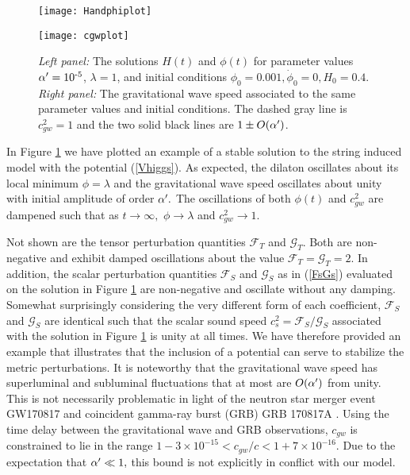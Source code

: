 \documentclass[amsmath,amssymb,11pt]{article}
\begin{document}
\begin{figure}[t]
    \centering
    \begin{minipage}{0.5\textwidth}
        \centering
        \texttt{[image: Handphiplot]} %
    \end{minipage}\hfill
    \begin{minipage}{0.5\textwidth}
        \centering
        \texttt{[image: cgwplot]} %
    \end{minipage}
    \caption{\textit{Left panel:} The solutions $H(t)$ and $\phi(t)$ for parameter values $\alpha'=10^{\text{-}5}$, $\lambda=1$, and initial conditions $\phi_0=0.001,\dot{\phi}_0=0,H_0=0.4.$ \textit{Right panel:} The gravitational wave speed associated to the same parameter values and initial conditions. The dashed gray line is $c_{gw}^2=1$ and the two solid black lines are $1\pm O(\alpha')$. }\label{fig:plots}
\end{figure}

In Figure \ref{fig:plots} we have plotted an example of a stable solution to the string induced model with the potential (\ref{Vhiggs}). As expected, the dilaton oscillates about its local minimum $\phi=\lambda$ and the gravitational wave speed oscillates about unity with initial amplitude of order $\alpha'.$ The oscillations of both $\phi(t)$ and $c_{gw}^2$ are dampened such that as $t\rightarrow\infty,$ $\phi\rightarrow\lambda$ and $c_{gw}^2\rightarrow 1.$

Not shown are the tensor perturbation quantities $\mathcal{F}_T$ and $\mathcal{G}_T$. Both are non-negative and exhibit damped oscillations about the value $\mathcal{F}_T=\mathcal{G}_T=2$. In addition, the scalar perturbation quantities $\mathcal{F}_S$ and $\mathcal{G}_S$ as in (\ref{FsGs}) evaluated on the solution in Figure \ref{fig:plots} are non-negative and oscillate without any damping. Somewhat surprisingly considering the very different form of each coefficient, $\mathcal{F}_S$ and $\mathcal{G}_S$ are identical such that the scalar sound speed $c_s^2=\mathcal{F}_S/\mathcal{G}_S$ associated with the solution in Figure \ref{fig:plots} is unity at all times. We have therefore provided an example that illustrates that the inclusion of a potential can serve to stabilize the metric perturbations. It is noteworthy that the gravitational wave speed has superluminal and subluminal fluctuations that at most are $O(\alpha')$ from unity. This is not necessarily problematic in light of the neutron star merger event GW170817 and coincident gamma-ray burst (GRB) GRB 170817A \cite{Monitor:2017mdv}.  Using the time delay between the gravitational wave and GRB observations, $c_{gw}$ is constrained to lie in the range $1-3\times 10^{-15}<c_{gw}/c < 1+7\times 10^{-16}$. Due to the expectation that $\alpha'\ll 1,$ this bound is not explicitly in conflict with our model.
\end{document}
